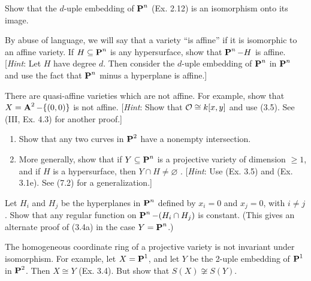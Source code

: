 \documentclass[10pt]{amsart}
\begin{document}
\begin{exercise}[3.4]
    Show that the $d$-uple embedding of $\pp^n$ (Ex. 2.12) is an isomorphism 
    onto its image.
\end{exercise}


\begin{exercise}[3.5]
    By abuse of language, we will say that a variety ``is affine'' if it is 
    isomorphic to an affine variety. If $H \subseteq \pp^n$ is any hypersurface, 
    show that $\pp^n - H$ is affine. 
    [\emph{Hint}: Let $H$ have degree $d$. Then consider the $d$-uple 
    embedding of $\pp^n$ in $\pp^n$ and use the fact that $\pp^n$ minus 
    a hyperplane is affine.]
\end{exercise}


\begin{exercise}[3.6]
    There are quasi-affine varieties which are not affine. For example, show that 
    $X = \aa^2 - \{(0,0)\}$ is not affine. [\emph{Hint}: Show 
    that $\cO \cong k[x,y]$
    and use (3.5). See (III, Ex. 4.3) for another proof.]
\end{exercise}


\begin{exercise}[3.7]  
    \begin{enumerate}[itemsep=1pt]
        \item Show that any two curves in $\pp^2$ have a nonempty intersection.
        \item More generally, show that if $Y \subseteq \pp^n$ is a projective variety of 
        dimension $\ge 1$, and if $H$ is a hypersurface, then $Y \cap H \ne \varnothing$ . 
        [\emph{Hint}: Use (Ex. 3.5) and (Ex. 3.1e). See (7.2) for a generalization.]
    \end{enumerate}
\end{exercise}


\begin{exercise}[3.8]
    Let $H_i$ and $H_j$ be the hyperplanes in $\pp^n$ defined by 
    $x_i = 0$ and $x_j = 0$, with $i \ne j$. Show that any regular function on 
    $\pp^n - (H_i \cap H_j)$ is constant. 
    (This gives an alternate proof of (3.4a) in the case $Y = \pp^n$.)
\end{exercise}


\begin{exercise}[3.9]
    The homogeneous coordinate ring of a projective variety is not invariant under 
    isomorphism. For example, let $X = \pp^1$, and let $Y$ be the 2-uple embedding of $\pp^1$ in $\pp^2$. 
    Then $X \cong Y$ (Ex. 3.4). But show that $S(X) \not\cong S(Y)$.
\end{exercise}
\end{document}
